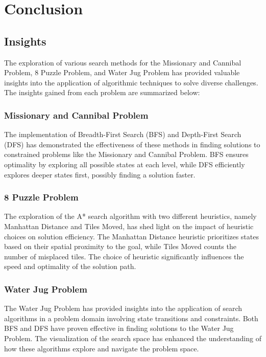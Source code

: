 \documentclass[12pt]{article}
\begin{document}
\section{Conclusion}

\subsection{Insights}

The exploration of various search methods for the Missionary and Cannibal Problem, 8 Puzzle Problem, and Water Jug Problem has provided valuable insights into the application of algorithmic techniques to solve diverse challenges. The insights gained from each problem are summarized below:

\subsubsection{Missionary and Cannibal Problem}
The implementation of Breadth-First Search (BFS) and Depth-First Search (DFS) has demonstrated the effectiveness of these methods in finding solutions to constrained problems like the Missionary and Cannibal Problem. BFS ensures optimality by exploring all possible states at each level, while DFS efficiently explores deeper states first, possibly finding a solution faster.

\subsubsection{8 Puzzle Problem}
The exploration of the A* search algorithm with two different heuristics, namely Manhattan Distance and Tiles Moved, has shed light on the impact of heuristic choices on solution efficiency. The Manhattan Distance heuristic prioritizes states based on their spatial proximity to the goal, while Tiles Moved counts the number of misplaced tiles. The choice of heuristic significantly influences the speed and optimality of the solution path.

\subsubsection{Water Jug Problem}
The Water Jug Problem has provided insights into the application of search algorithms in a problem domain involving state transitions and constraints. Both BFS and DFS have proven effective in finding solutions to the Water Jug Problem. The visualization of the search space has enhanced the understanding of how these algorithms explore and navigate the problem space.
\end{document}
